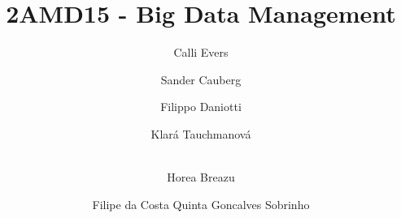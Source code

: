 \documentclass[final]{beamer}
\title{2AMD15 - Big Data Management}
\author{
    Calli Evers \and 
    Sander Cauberg \and 
    Filippo Daniotti \and
    Klará Tauchmanová \and \\
    Horea Breazu \and
    Filipe 
        da Costa Quinta Goncalves 
    Sobrinho
}
\institute[shortinst]{ Eindhoven University of Technology }
\newlength{\sepwidth}
\newlength{\colwidth}
\newcommand{\separatorcolumn}{\begin{column}{\sepwidth}\end{column}}
\begin{document}

\begin{frame}[t]
\begin{columns}[t]
\separatorcolumn

\begin{column}{\colwidth}


\end{column}

\separatorcolumn

\begin{column}{\colwidth}


\end{column}
\separatorcolumn

\end{columns}
\end{frame}
\end{document}
